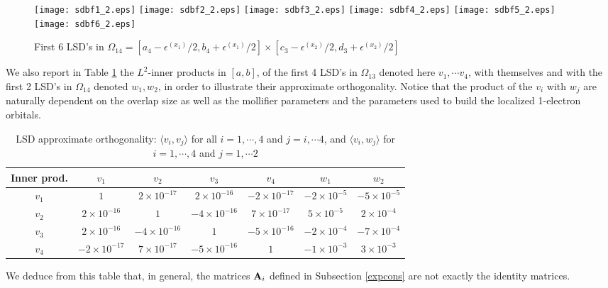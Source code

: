 \begin{figure}[!ht]
\begin{center}
\hspace*{1mm}\texttt{[image: sdbf1\_2.eps]}
\hspace*{1mm}\texttt{[image: sdbf2\_2.eps]}
\hspace*{1mm}\texttt{[image: sdbf3\_2.eps]}
\hspace*{1mm}\texttt{[image: sdbf4\_2.eps]}
\hspace*{1mm}\texttt{[image: sdbf5\_2.eps]}
\hspace*{1mm}\texttt{[image: sdbf6\_2.eps]}
\caption{First $6$ LSD's in $\Omega_{14}=[a_4-\epsilon^{(x_1)}/2,b_4+\epsilon^{(x_1)}/2]\times[c_3-\epsilon^{(x_2)}/2,d_3+\epsilon^{(x_2)}/2]$}
\label{SDBF_4x3}
\end{center}
\end{figure}
We also report in Table \ref{table1} the $L^{2}$-inner products in $[a,b]$, of the first 4 LSD's in $\Omega_{13}$ denoted here $v_{1},\cdots v_4$, with themselves and with the first 2 LSD's in $\Omega_{14}$ denoted $w_{1},w_2$, in order to illustrate their approximate orthogonality. Notice that the product of the $v_i$ with $w_j$ are naturally dependent on the overlap size as well as the mollifier parameters and the parameters used to build the localized 1-electron orbitals.
\begin{table}
\caption{LSD approximate orthogonality: $\langle v_i,v_j\rangle$ for all $i=1,\cdots,4$ and $j=i,\cdots 4$,  and $\langle v_i,w_j\rangle$ for $i=1,\cdots,4$ and $j=1,\cdots 2$}
\centering
\begin{tabular}{ccccccc}
Inner prod. & $v_1$ & $v_2$ & $v_3$ & $v_4$ & $w_1$ & $w_2$ \\
\hline
$v_1$ & $1$ & $2 \times 10^{-17}$ & $2\times 10^{-16}$ & $-2\times 10^{-17}$ & $-2\times 10^{-5}$ & $-5\times 10^{-5}$\\
$v_2$ & $2 \times 10^{-16}$ & $1$ & $-4\times 10^{-16}$ & $7\times 10^{-17}$ & $5\times 10^{-5}$ & $2\times 10^{-4}$\\
$v_3$ & $2\times 10^{-16}$  & $-4\times 10^{-16}$ & $1$ & $-5\times 10^{-16}$  & $-2\times 10^{-4}$ & $-7\times 10^{-4}$ \\
$v_4$ & $-2\times 10^{-17}$  &  $7\times 10^{-17}$ & $-5\times 10^{-16}$ & $1$ & $-1\times 10^{-3}$ & $3\times 10^{-3}$ \\
\hline
\end{tabular}
\label{table1}
\end{table}
We deduce from this table that, in general, the matrices ${\bf A}_i$ defined in Subsection \ref{expcons} are not exactly the identity matrices. 
